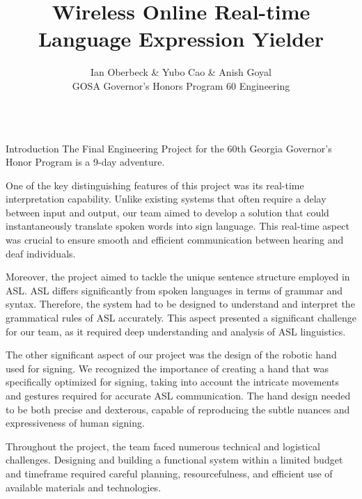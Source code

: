 \documentclass[final, 20pt]{beamer}
\title{Wireless Online Real-time Language Expression Yielder}
\author{Ian Oberbeck \& Yubo Cao \& Anish Goyal \\\normalfont\selectfont GOSA Governor's Honors Program 60 Engineering}
\newlength{\colwidth}
\begin{document}
\begin{frame}[t]
  \centering
  \begin{columns}[t]
    \margincolumn

    \begin{column}{\colwidth}
      \begin{block}{Introduction}
        The Final Engineering Project for the 60th Georgia Governor's Honor Program is a 9-day adventure.


        One of the key distinguishing features of this project was its real-time interpretation capability. Unlike existing systems that often require a delay between input and output, our team aimed to develop a solution that could instantaneously translate spoken words into sign language. This real-time aspect was crucial to ensure smooth and efficient communication between hearing and deaf individuals.

        Moreover, the project aimed to tackle the unique sentence structure employed in ASL. ASL differs significantly from spoken languages in terms of grammar and syntax. Therefore, the system had to be designed to understand and interpret the grammatical rules of ASL accurately. This aspect presented a significant challenge for our team, as it required deep understanding and analysis of ASL linguistics.

        The other significant aspect of our project was the design of the robotic hand used for signing. We recognized the importance of creating a hand that was specifically optimized for signing, taking into account the intricate movements and gestures required for accurate ASL communication. The hand design needed to be both precise and dexterous, capable of reproducing the subtle nuances and expressiveness of human signing.

        Throughout the project, the team faced numerous technical and logistical challenges. Designing and building a functional system within a limited budget and timeframe required careful planning, resourcefulness, and efficient use of available materials and technologies.



\end{block}
\end{column}
\end{columns}
\end{frame}
\end{document}
